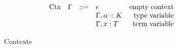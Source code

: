 \documentclass[../main.tex]{subfiles}
\begin{document}
\begin{figure*}[t]
    \[\begin{array}{lrclr}
        \textrm{Ctx} & \Gamma  & ::= & \epsilon                    & \textrm{empty context} \\
                     &         &     & \Gamma, \alpha :: K   & \textrm{type variable} \\
                     &         &     & \Gamma, x : T        & \textrm{term variable} \\
    \end{array}\]
    
    \caption{Contexts}
    \label{fig:Plutus_core_contexts}
\end{figure*}
\end{document}
